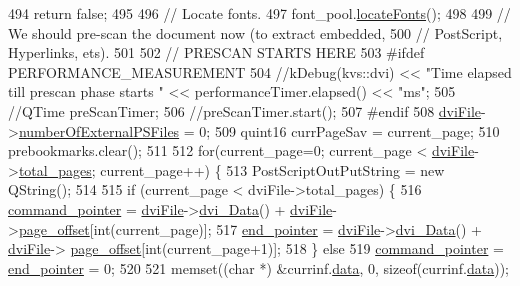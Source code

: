 \begin{DoxyCode}
{{494     \textcolor{keywordflow}{return} \textcolor{keyword}{false};
495 
496   \textcolor{comment}{// Locate fonts.}
497   font\_pool.\hyperlink{classfontPool_a46fecbc3b61af504c2327a1df7d76fdd}{locateFonts}();
498 
499   \textcolor{comment}{// We should pre-scan the document now (to extract embedded,}
500   \textcolor{comment}{// PostScript, Hyperlinks, ets).}
501 
502   \textcolor{comment}{// PRESCAN STARTS HERE}
503 \textcolor{preprocessor}{#ifdef PERFORMANCE\_MEASUREMENT}
504   \textcolor{comment}{//kDebug(kvs::dvi) << "Time elapsed till prescan phase starts " << performanceTimer.elapsed() << "ms";}
505   \textcolor{comment}{//QTime preScanTimer;}
506   \textcolor{comment}{//preScanTimer.start();}
507 \textcolor{preprocessor}{#endif}
508   \hyperlink{classdviRenderer_a67ded13a1a8da343aa0ee921ed96d4c2}{dviFile}->\hyperlink{classdvifile_abd8bd3fc29f66ce9220efbd0246d7fc0}{numberOfExternalPSFiles} = 0;
509   quint16 currPageSav = current\_page;
510   prebookmarks.clear();
511 
512   \textcolor{keywordflow}{for}(current\_page=0; current\_page < \hyperlink{classdviRenderer_a67ded13a1a8da343aa0ee921ed96d4c2}{dviFile}->\hyperlink{classdvifile_a71577dbd82a462b855abc96be3b369c5}{total\_pages}; current\_page++) \{
513     PostScriptOutPutString = \textcolor{keyword}{new} QString();
514 
515     \textcolor{keywordflow}{if} (current\_page < dviFile->total\_pages) \{
516       \hyperlink{classbigEndianByteReader_aa8919f6fe116fd3230337675fd23abac}{command\_pointer} = \hyperlink{classdviRenderer_a67ded13a1a8da343aa0ee921ed96d4c2}{dviFile}->\hyperlink{classdvifile_a81f1d32c52377a7b1802072eb40998b7}{dvi\_Data}() + 
      \hyperlink{classdviRenderer_a67ded13a1a8da343aa0ee921ed96d4c2}{dviFile}->\hyperlink{classdvifile_aeafc97277647ad5077a774be71b3253a}{page\_offset}[int(current\_page)];
517       \hyperlink{classbigEndianByteReader_ace2790221530572c87c58f1f77924beb}{end\_pointer}     = \hyperlink{classdviRenderer_a67ded13a1a8da343aa0ee921ed96d4c2}{dviFile}->\hyperlink{classdvifile_a81f1d32c52377a7b1802072eb40998b7}{dvi\_Data}() + \hyperlink{classdviRenderer_a67ded13a1a8da343aa0ee921ed96d4c2}{dviFile}->
      \hyperlink{classdvifile_aeafc97277647ad5077a774be71b3253a}{page\_offset}[int(current\_page+1)];
518     \} \textcolor{keywordflow}{else}
519       \hyperlink{classbigEndianByteReader_aa8919f6fe116fd3230337675fd23abac}{command\_pointer} = \hyperlink{classbigEndianByteReader_ace2790221530572c87c58f1f77924beb}{end\_pointer} = 0;
520 
521     memset((\textcolor{keywordtype}{char} *) &currinf.\hyperlink{structdrawinf_af73f66288002f0a25c7843a534bf1340}{data}, 0, \textcolor{keyword}{sizeof}(currinf.\hyperlink{structdrawinf_af73f66288002f0a25c7843a534bf1340}{data}));
}}
\end{DoxyCode}
